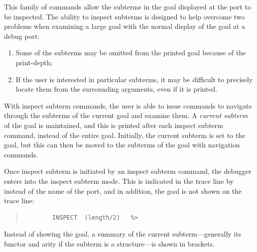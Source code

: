 This family of commands allow the subterms in the goal displayed at the
port to be inspected.
The ability to inspect subterms is designed to help overcome two problems
when examining a large goal with the normal display of the goal at a debug
port:
\begin{enumerate}
\item Some of the subterms may be omitted from the printed goal because
of the print-depth;

\item If the user is interested in particular subterms, it
may be difficult to precisely locate them from the surrounding arguments,
even if it is printed.
\end{enumerate}

With inspect subterm commands, the user is able to issue commands to
navigate through the subterms of the current goal and examine them.
A \emph{current subterm} of the goal is maintained, and this is
printed after each inspect subterm command, instead of the entire goal.
Initially, the current subterm is set to the goal, but this can then be
moved to the subterms of the goal with navigation commands.

Once inspect subterm is initiated by an inspect subterm command, the
debugger enters into the inspect subterm mode. This is indicated in the
trace line by  instead of the name of the port, and in
addition,
the goal is not shown on the trace line:

\begin{quote}
\begin{verbatim}
        INSPECT  (length/2)   %>
\end{verbatim}
\end{quote}

Instead of showing the goal, a summary of the current subterm---generally its
functor and arity if the subterm is a structure---is shown in brackets.

